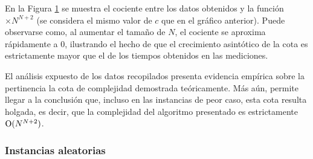             En la Figura \ref{fig:exp3:part_tiempo_sobre_exp} se muestra el cociente entre los datos obtenidos y la función $\times N^{N + 2}$ (se considera el mismo valor de $c$ que en el gráfico anterior). Puede observarse como, al aumentar el tamaño de $N$, el cociente se aproxima rápidamente a $0$, ilustrando el hecho de que el crecimiento asintótico de la cota es estrictamente mayor que el de los tiempos obtenidos en las mediciones.

            \begin{figure}[H]
                \centering
                \caption{}
                \label{fig:exp3:part_tiempo_sobre_exp}
            \end{figure}

            El análisis expuesto de los datos recopilados presenta evidencia empírica sobre la pertinencia la cota de complejidad demostrada teóricamente. Más aún, permite llegar a la conclusión que, incluso en las instancias de peor caso, esta cota resulta holgada, es decir, que la complejidad del algoritmo presentado es estrictamente $\operatorname{O}(N^{N+2})$.

        \subsubsection{Instancias aleatorias}
